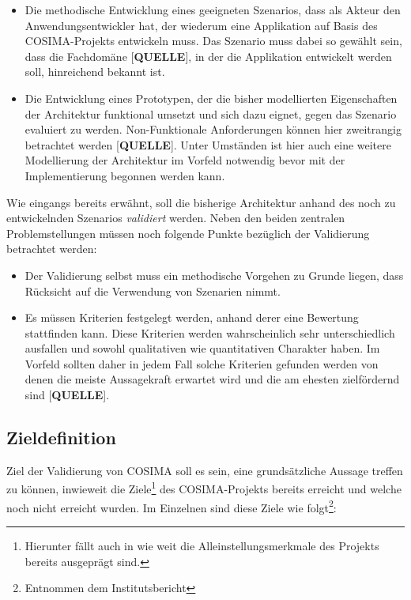   \begin{itemize}
    \item Die methodische Entwicklung eines geeigneten Szenarios, dass als Akteur den Anwendungsentwickler hat, der wiederum eine Applikation auf Basis des COSIMA-Projekts entwickeln muss. Das Szenario muss dabei so gewählt sein, dass die Fachdomäne [\textbf{QUELLE}], in der die Applikation entwickelt werden soll, hinreichend bekannt ist.
    \item Die Entwicklung eines Prototypen, der die bisher modellierten Eigenschaften der Architektur funktional umsetzt und sich dazu eignet, gegen das Szenario evaluiert zu werden. Non-Funktionale Anforderungen können hier zweitrangig betrachtet werden [\textbf{QUELLE}]. Unter Umständen ist hier auch eine weitere Modellierung der Architektur im Vorfeld notwendig bevor mit der Implementierung begonnen werden kann.
  \end{itemize}

  Wie eingangs bereits erwähnt, soll die bisherige Architektur anhand des noch zu entwickelnden Szenarios \emph{validiert} werden. Neben den beiden zentralen Problemstellungen müssen noch folgende Punkte bezüglich der Validierung betrachtet werden:

  \begin{itemize}
    \item Der Validierung selbst muss ein methodische Vorgehen zu Grunde liegen, dass Rücksicht auf die Verwendung von Szenarien nimmt.
    \item Es müssen Kriterien festgelegt werden, anhand derer eine Bewertung stattfinden kann. Diese Kriterien werden wahrscheinlich sehr unterschiedlich ausfallen und sowohl qualitativen wie quantitativen Charakter haben. Im Vorfeld sollten daher in jedem Fall solche Kriterien gefunden werden von denen die meiste Aussagekraft erwartet wird und die am ehesten zielfördernd sind [\textbf{QUELLE}].
  \end{itemize}


\subsection{Zieldefinition} %
\label{ssec:zieldefinition}

  Ziel der Validierung von COSIMA soll es sein, eine grundsätzliche Aussage treffen zu können, inwieweit die Ziele\footnote{Hierunter fällt auch in wie weit die Alleinstellungsmerkmale des Projekts bereits ausgeprägt sind.} des COSIMA-Projekts bereits erreicht und welche noch nicht erreicht wurden. Im Einzelnen sind diese Ziele wie folgt\footnote{Entnommen dem Institutsbericht}:
  
